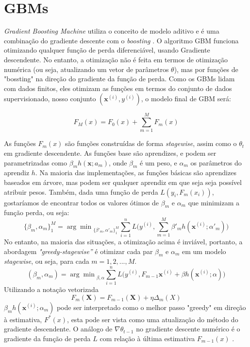 \section{GBMs}
\textit{Gradient Boosting Machine} utiliza o conceito de modelo aditivo e é uma combinação do gradiente descente com o \textit{boosting} \cite{greedy}. O algoritmo GBM funciona otimizando qualquer função de perda diferenciável, usando Gradiente descendente. No entanto, a otimização não é feita em termos de otimização numérica (ou seja, atualizando um vetor de parâmetros $\theta$), mas por funções de "bossting" na direção do gradiente da função de perda. Como os GBMs lidam com dados finitos, eles otimizam as funções em termos do conjunto de dados supervisionado, nosso conjunto $(\mathbf{x}^{(i)} , y^{(i)})$, o modelo final de GBM será:

\begin{equation}
    F_M(x) = F_0(x) + \sum_{m=1}^MF_m(x)
\end{equation}

As funções $F_m(x)$ são funções construídas de forma \textit{stagewise}, assim como o $\theta_t$ em gradiente descendente. As funções base são aprendizes, e podem ser parametrizadas como $\beta_m h(\mathbf{x};a_m)$, onde $\beta_m$
é um peso, e $\alpha_m$ os parâmetros do aprendiz $h$. Na maioria das implementações, as funções básicas são aprendizes baseados em árvore, mas podem ser qualquer aprendiz em que seja seja possível atribuir pesos. Também, dada uma função de perda $L(y_i , F_m(x_i))$, gostaríamos de encontrar todos os valores ótimos de $\beta_m$ e $\alpha_m$ que minimizam a função perda, ou seja:
\begin{equation*}
    \{\beta_m,\alpha_m\}_1^M = {\arg\min}_{\{\beta'_m,\alpha'_m\}_1^M}\sum_{i=1}^n L\Biggl(y^{(i)},\sum_{m=1}^M\beta'_mh(\mathbf{x}^{(i)};\alpha'_m)\Biggl)
\end{equation*}
No entanto, na maioria das situações, a otimização acima é inviável, portanto, a abordagem \textit{"greedy-stagewise”} é otimizar cada par $\beta_m$ e $\alpha_m$ em um modelo \textit{stagewise}, ou seja, para cada $m = 1, 2, ..., M$.
\begin{equation}\label{eq:interacoes}
    (\beta_m,\alpha_m) = {\arg\min}_{\beta,\alpha}\sum_{i=1}^n L\Biggl(y^{(i)},F_{m-1}\mathbf{x}^{(i)} + \beta h(\mathbf{x}^{(i)};\alpha)\Biggl)
\end{equation}
Utilizando a notação vetorizada 
\begin{equation}
    F_m(\mathbf{X}) = F_{m-1}(\mathbf{X}) + \eta \Delta_m(X)
\end{equation}
$\beta_m h(\mathbf{x}^{(i)};\alpha_m)$ pode ser interpretado como o melhor passo "greedy" em direção à estimativa, $F^*(x)$, esta pode ser vista como uma atualização do método do gradiente descendente. O análogo de $\nabla{\theta_{t-1}}$ no gradiente descente numérico é o gradiente da função de perda $L$ com relação à última estimativa $F_{m−1}(x)$ \cite{greedy}.


